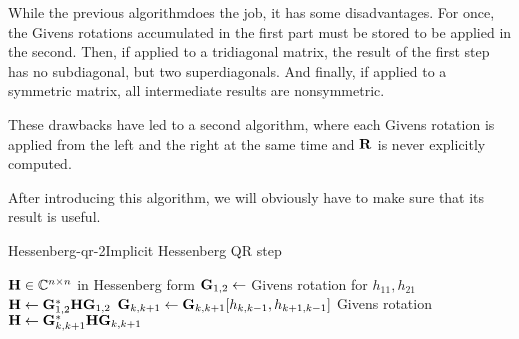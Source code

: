 \begin{remark}
  While the previous algorithmdoes the job, it has some
  disadvantages. For once, the Givens rotations accumulated in the
  first part must be stored to be applied in the second. Then, if
  applied to a tridiagonal matrix, the result of the first step has no
  subdiagonal, but two superdiagonals. And finally, if applied to a
  symmetric matrix, all intermediate results are nonsymmetric.

  These drawbacks have led to a second algorithm, where each Givens
  rotation is applied from the left and the right at the same time and
  $\mathbf R$ is never explicitly computed.

  After introducing this algorithm, we will obviously have to make
  sure that its result is useful.
\end{remark}

\begin{Algorithm*}{Hessenberg-qr-2}{Implicit Hessenberg QR step}
  \begin{algorithmic}[1]
    \Require $\mathbf H\in\mathbb C^{n\times n}$ in Hessenberg form
    \State $\mathbf G_{1,2} \gets$ Givens rotation for $h_{11},h_{21}$
    \State $\mathbf H \gets \mathbf G^*_{1,2}\mathbf H \mathbf G_{1,2}$
    \State $\mathbf G_{k,k+1}\gets \mathbf G_{k,k+1}[h_{k,k-1},h_{k+1,k-1}]$ Givens rotation
    \State $\mathbf H \gets \mathbf G^*_{k,k+1}\mathbf H \mathbf G_{k,k+1}$
    \EndFor
  \end{algorithmic}
\end{Algorithm*}


